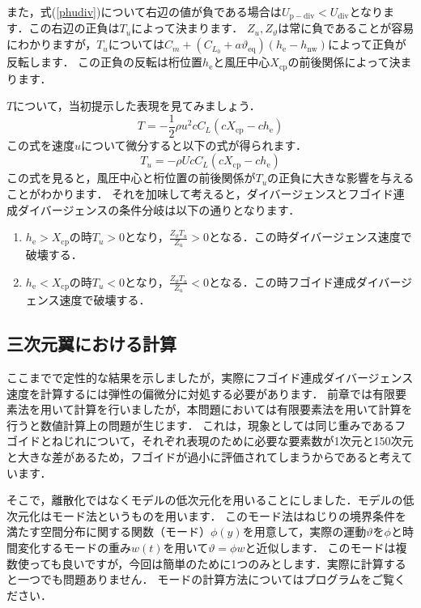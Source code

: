\documentclass{jarticle}
\begin{document}
また，式(\ref{phudiv})について右辺の値が負である場合は$U_\mathrm{p-div} < U_\mathrm{div}$となります．この右辺の正負は$T_u$によって決まります．
$Z_u,Z_\vartheta$は常に負であることが容易にわかりますが，$T_u$については$C_m +  (C_{L_0} + a\vartheta_\mathrm{eq})  (h_\mathrm{e}-h_\mathrm{nw})$によって正負が反転します．
この正負の反転は桁位置$h_\mathrm{e}$と風圧中心$X_\mathrm{cp}$の前後関係によって決まります．

$T$について，当初提示した表現を見てみましょう．
\begin{equation}
    T = -\frac{1}{2}\rho u^2 c C_L (cX_\mathrm{cp} - ch_\mathrm{e})
\end{equation}
この式を速度$u$について微分すると以下の式が得られます．
\begin{equation}
    T_u = -\rho U c C_L (cX_\mathrm{cp} - ch_\mathrm{e})
\end{equation}
この式を見ると，風圧中心と桁位置の前後関係が$T_u$の正負に大きな影響を与えることがわかります．
それを加味して考えると，ダイバージェンスとフゴイド連成ダイバージェンスの条件分岐は以下の通りとなります．
\begin{enumerate}
    \item $h_\mathrm{e} > X_\mathrm{cp}$の時$T_u>0$となり，$\frac{Z_\vartheta T_u}{Z_u} > 0$となる．この時ダイバージェンス速度で破壊する．
    \item $h_\mathrm{e} < X_\mathrm{cp}$の時$T_u<0$となり，$\frac{Z_\vartheta T_u}{Z_u} < 0$となる．この時フゴイド連成ダイバージェンス速度で破壊する．
\end{enumerate}

\subsection{三次元翼における計算}

ここまでで定性的な結果を示しましたが，実際にフゴイド連成ダイバージェンス速度を計算するには弾性の偏微分に対処する必要があります．
前章では有限要素法を用いて計算を行いましたが，本問題においては有限要素法を用いて計算を行うと数値計算上の問題が生じます．
これは，現象としては同じ重みであるフゴイドとねじれについて，それぞれ表現のために必要な要素数が1次元と150次元と大きな差があるため，フゴイドが過小に評価されてしまうからであると考えています．

そこで，離散化ではなくモデルの低次元化を用いることにしました．モデルの低次元化はモード法というものを用います．
このモード法はねじりの境界条件を満たす空間分布に関する関数（モード）$\phi(y)$を用意して，実際の運動$\vartheta$を$\phi$と時間変化するモードの重み$w(t)$を用いて$\vartheta=\phi w$と近似します．
このモードは複数使っても良いですが，今回は簡単のために1つのみとします．実際に計算すると一つでも問題ありません．
モードの計算方法についてはプログラムをご覧ください．
\end{document}
